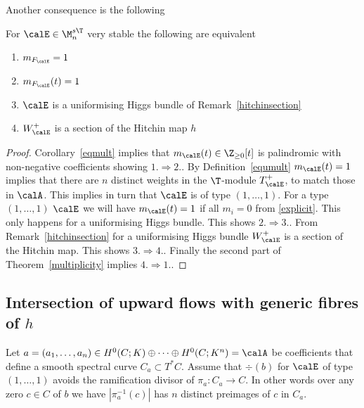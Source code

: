 Another consequence is the following
\begin{corollary}
\notready For $\calE\in \M^{s\T}_n$ very stable the following are equivalent \begin{enumerate}\item $m_{{F_\calE}}=1$ 		\item $m_{{F_\calE}}(t)=1$  \item $\calE$ is a uniformising Higgs bundle of Remark~\ref{hitchinsection} %

		\item $W^+_\calE$ is a section of the Hitchin map $h$
	\end{enumerate}
\end{corollary}
\begin{proof} Corollary~\ref{eqmult} implies that $m_{\calE}(t)\in \Z_{\geq0}[t]$ is palindromic with non-negative coefficients  showing $1.\Rightarrow 2.$.  By Definition~\ref{equmult}  $m_{\calE}(t)=1$ implies that there are $n$ distinct weights in the $\T$-module $T^+_\calE$, to match those in $\calA$.  This implies in turn that $\calE$ is of type $(1,\dots,1)$. For a type $(1,\dots,1)$ $\calE$ we will have $m_{\calE}(t)=1$ if all $m_i=0$ from \eqref{explicit}. This only happens for a  uniformising Higgs bundle. This shows $2.\Rightarrow 3.$.  From Remark~\ref{hitchinsection} for a uniformising Higgs bundle   $W^+_\calE$ is a section of the Hitchin map. This shows $3.\Rightarrow 4.$. Finally the second part of Theorem~\ref{multiplicity} implies $4.\Rightarrow1.$.
\end{proof}

\subsection{Intersection of upward flows with generic fibres of $h$}
\label{intersection}



Let ${{a}}=(a_1,\dots,a_n)\in H^0(C;K)\oplus \dots \oplus H^0(C;K^n)=\calA$ be coefficients that define a smooth spectral curve $C_a\subset T^*C$.   Assume that $\div(b)$ for $\calE$ of type $(1,\dots,1)$ avoids the ramification divisor of $\pi_a:C_a\to C$. In other words over any zero $c\in C$ of $b$ we have $|\pi_a^{-1}(c)|$ has $n$ distinct preimages of $c$ in $C_a$.


